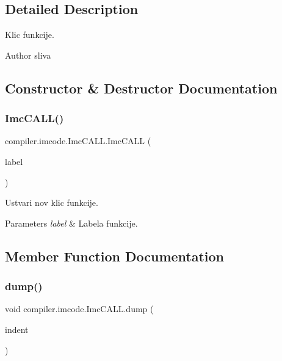 \subsection{Detailed Description}
Klic funkcije.

\begin{DoxyAuthor}{Author}
sliva 
\end{DoxyAuthor}


\subsection{Constructor \& Destructor Documentation}
\mbox{\label{classcompiler_1_1imcode_1_1_imc_c_a_l_l_acd8aba4e577fd131e2769921272ce540}} 
\subsubsection{\texorpdfstring{Imc\+C\+A\+L\+L()}{ImcCALL()}}
{\footnotesize\ttfamily compiler.\+imcode.\+Imc\+C\+A\+L\+L.\+Imc\+C\+A\+LL (\begin{DoxyParamCaption}\item[{\hyperlink{classcompiler_1_1frames_1_1_frm_label}{Frm\+Label}}]{label }\end{DoxyParamCaption})}

Ustvari nov klic funkcije.


\begin{DoxyParams}{Parameters}
{\em label} & Labela funkcije. \\
\hline
\end{DoxyParams}


\subsection{Member Function Documentation}
\mbox{\label{classcompiler_1_1imcode_1_1_imc_c_a_l_l_a9cbde704450bc77440e999be90f11de1}} 
\subsubsection{\texorpdfstring{dump()}{dump()}}
{\footnotesize\ttfamily void compiler.\+imcode.\+Imc\+C\+A\+L\+L.\+dump (\begin{DoxyParamCaption}\item[{int}]{indent }\end{DoxyParamCaption})}

